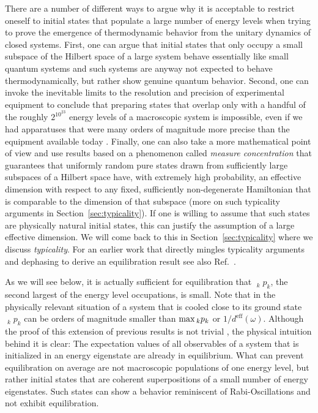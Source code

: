 \documentclass[a4paper,12pt,listof=totoc,index=totoc,bibliography=totoc,headsepline=false,headings=normal,BCOR16.153846mm,DIV12,headinclude,twoside,cleardoublepage=empty,numbers=noenddot,final]{scrreprt}
\theoremstyle{mystyle}
\numberwithin{equation}{section}
\numberwithin{figure}{section}
\numberwithin{lemma}{section}
\numberwithin{theorem}{section}
\numberwithin{corollary}{section}
\numberwithin{definition}{section}
\numberwithin{conjecture}{section}
\numberwithin{observation}{section}
\newcommand{\+}{\mkern2mu}
\renewcommand{\max}{\mathchoice{\operatorname*{max}}{\operatorname*{max}}{\mathrm{max}}{\mathrm{max}}} %
\newcommand{\deff}{d^{\mathrm{eff}}}
\DeclareMathOperator*{\maxprime}{\mathrm{max}^\prime}
\DeclareMathOperator{\1}{\mathds{1}}
\begin{document}
There are a number of different ways to argue why it is acceptable to restrict oneself to initial states that populate a large number of energy levels when trying to prove the emergence of thermodynamic behavior from the unitary dynamics of closed systems.
First, one can argue that initial states that only occupy a small subspace of the Hilbert space of a large system behave essentially like small quantum systems and such systems are anyway not expected to behave thermodynamically, but rather show genuine quantum behavior.
Second, one can invoke the inevitable limits to the resolution and precision of experimental equipment to conclude that preparing states that overlap only with a handful of the roughly $2^{10^{23}}$ energy levels of a macroscopic system is impossible, even if we had apparatuses that were many orders of magnitude more precise than the equipment available today \cite{Reimann08,Reimann12}.
Finally, one can also take a more mathematical point of view and use results based on a phenomenon called \emph{measure concentration} \cite{ledoux01,CHATTERJEE07} that guarantees that uniformly random pure states drawn from sufficiently large subspaces of a Hilbert space have, with extremely high probability, an effective dimension with respect to any fixed, sufficiently non-degenerate Hamiltonian that is comparable to the dimension of that subspace \cite{Linden09,Popescu06,Popescu05,Gogolin10-masterthesis} (more on such typicality arguments in Section~\ref{sec:typicality}).
If one is willing to assume that such states are physically natural initial states, this can justify the assumption of a large effective dimension.
We will come back to this in Section~\ref{sec:typicality} where we discuss \emph{typicality}.
For an earlier work that directly mingles typicality arguments and dephasing to derive an equilibration result see also Ref.~\cite{Bocchieri1959}.

As we will see below, it is actually sufficient for equilibration that $\maxprime_k p_k$, the second largest of the energy level occupations, is small.
Note that in the physically relevant situation of a system that is cooled close to its ground state $\maxprime_k p_k$ can be orders of magnitude smaller than $\max_k p_k$ or $1/\deff(\omega)$.
Although the proof of this extension of previous results is not trivial \cite{Reimann12}, the physical intuition behind it is clear:
The expectation values of all observables of a system that is initialized in an energy eigenstate are already in equilibrium.
What can prevent equilibration on average are not macroscopic populations of one energy level, but rather initial states that are coherent superpositions of a small number of energy eigenstates.
Such states can show a behavior reminiscent of Rabi-Oscillations and not exhibit equilibration.
\end{document}
